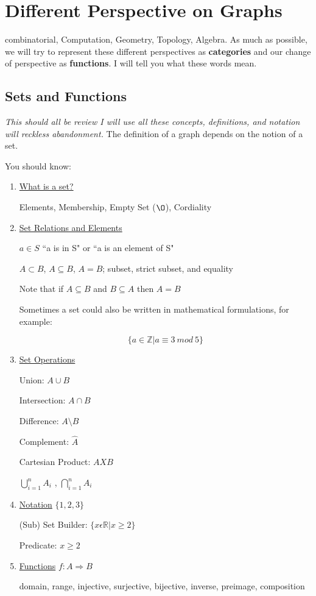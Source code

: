 \documentclass{article}
\theoremstyle{definition}
\theoremstyle{remark}
\begin{document}
\section{Different Perspective on Graphs}
combinatorial, Computation, Geometry, Topology, Algebra. As much as possible, we will try to represent these different perspectives as \textbf{categories} and our change of perspective as \textbf{functions}. I will tell you what these words mean.

\subsection{Sets and Functions}
\textit{This should all be review I will use all these concepts, definitions, and notation will reckless abandonment.}
The definition of a graph depends on the notion of a set. 

You should know:
\begin{enumerate}
    \item \underline{What is a set?} 
    
    Elements, Membership, Empty Set ($\O$), Cordiality
    \item \underline{Set Relations and Elements}
    
    $a \in S$ ``a is in S" or ``a is an element of S"
    
    $A \subset B$, $A \subseteq B$, $A = B$; subset, strict subset, and equality
    
    Note that if $A \subseteq B$ and $B \subseteq A$ then $A = B$
    
    Sometimes a set could also be written in mathematical formulations, for example:
    
    $$\{a \in \mathbb{Z} | a \equiv 3\ mod\ 5\}$$
    
    \item \underline{Set Operations}
    
    Union: $A \cup B$ 
    
    Intersection: $A \cap B$
    
    Difference: $A \setminus B$
    
    Complement: $\hat{A}$
    
    Cartesian Product: $A X B$
    
    $\bigcup\limits_{i = 1}^{n} A_i$ ,  $\bigcap\limits_{i = 1}^{n} A_i$
    \item \underline{Notation}
    $\{1,2,3\}$
    
    (Sub) Set Builder: $\{x \epsilon \mathbb{R}| x \geq 2\}$
    
    Predicate: $x \geq 2$
    \item \underline{Functions}
    $f: A \Rightarrow B$
    
    domain, range, injective, surjective, bijective, inverse, preimage, composition

\end{enumerate}
\end{document}
